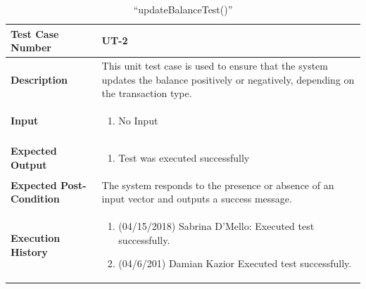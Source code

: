 \documentclass[12pt]{article}
\begin{document}
\begin{table}[H]
\caption{“updateBalanceTest()”}
\begin{center}
\begin{tabular}{|p{5.5cm}|p{11cm}|}
  \hline
  \bf Test Case Number & UT-2\\\hline
  \bf Description & 
  This unit test case is used to ensure that the system updates the balance positively or negatively, depending on the transaction type.\\\hline
  \bf Input &
  \begin{enumerate}
  \item No Input
  \end{enumerate}
  \\\hline
  \bf Expected Output &
  \begin{enumerate}
  \item Test was executed successfully
  \end{enumerate}
  \\\hline
  \bf Expected Post-Condition & 
  The system responds to the presence or absence of an input vector and outputs a success message.
  \\\hline   
  \bf Execution History & 
  \begin{enumerate}
  \item (04/15/2018) Sabrina D’Mello: Executed test successfully.
  \item (04/6/201) Damian Kazior Executed test successfully.
  \end{enumerate}
  \\\hline
\end{tabular}
\end{center}
\end{table}
\end{document}
